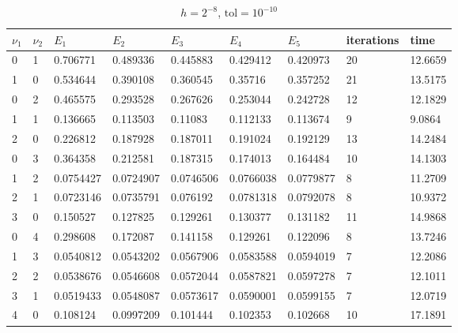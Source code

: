 \documentclass{article} %
\theoremstyle{plain}
\numberwithin{equation}{section} %
\numberwithin{figure}{section} %
\numberwithin{table}{section} %
\begin{document}
\begin{table}[ht!]
\centering
\begin{tabular}{||l|l|||l|l|l|l|l||l||l||}
\hline\hline
   $\nu_1$ &   $\nu_2$ &       $E_1$ &       $E_2$ &       $E_3$ &       $E_4$ &      $E_5$ &   iterations &     time \\
\hline\hline
      0 &      1 & 0.706771  & 0.489336  & 0.445883  & 0.429412  & 0.420973  &    {\color{red}20} & {\color{red}12.6659} \\\hline
      1 &      0 & {\color{red}0.534644}  & {\color{red}0.390108}  & {\color{red}0.360545}  & {\color{red}0.35716}   & {\color{red}0.357252}  &    21 & 13.5175 \\\hline\hline\hline

      0 &      2 & 0.465575  & 0.293528  & 0.267626  & 0.253044  & 0.242728  &    12 & 12.1829 \\\hline
      1 &      1 & {\color{red}0.136665}  & {\color{red}0.113503}  & {\color{red}0.11083}   & {\color{red}0.112133}  & {\color{red}0.113674}  &     {\color{red}9} &  {\color{red}9.0864} \\\hline
      2 &      0 & 0.226812  & 0.187928  & 0.187011  & 0.191024  & 0.192129  &    13 & 14.2484 \\\hline\hline\hline

      0 &      3 & 0.364358  & 0.212581  & 0.187315  & 0.174013  & 0.164484  &    10 & 14.1303 \\\hline
      1 &      2 & 0.0754427 & {\color{red}0.0724907} & {\color{red}0.0746506} & {\color{red}0.0766038} & {\color{red}0.0779877} &     {\color{red}8} & 11.2709 \\\hline
      2 &      1 & {\color{red}0.0723146} & 0.0735791 & 0.076192  & 0.0781318 & 0.0792078 &     {\color{red}8} & {\color{red}10.9372} \\\hline
      3 &      0 & 0.150527  & 0.127825  & 0.129261  & 0.130377  & 0.131182  &    11 & 14.9868 \\\hline\hline\hline

      0 &      4 & 0.298608  & 0.172087  & 0.141158  & 0.129261  & 0.122096  &     8 & 13.7246 \\\hline
      1 &      3 & 0.0540812 & {\color{red}0.0543202} & {\color{red}0.0567906} & {\color{red}0.0583588} & {\color{red}0.0594019} &     {\color{red}7} & 12.2086 \\\hline
      2 &      2 & 0.0538676 & 0.0546608 & 0.0572044 & 0.0587821 & 0.0597278 &     {\color{red}7} & 12.1011 \\\hline
      3 &      1 & {\color{red}0.0519433} & 0.0548087 & 0.0573617 & 0.0590001 & 0.0599155 &     {\color{red}7} & {\color{red}12.0719} \\\hline
      4 &      0 & 0.108124  & 0.0997209 & 0.101444  & 0.102353  & 0.102668  &    10 & 17.1891 \\\hline\hline\hline
\end{tabular}
\caption*{$h=2^{-8}$, $\text{tol}=10^{-10}$}
\end{table}
\end{document}
